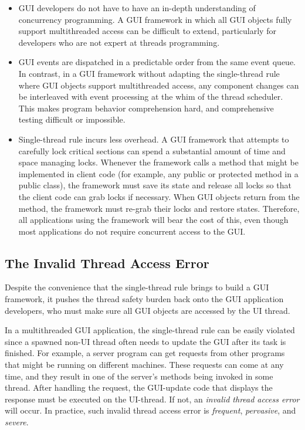 \begin{itemize}

\item GUI developers do not have to have an in-depth
understanding of concurrency programming. A GUI framework in which all GUI objects
fully support multithreaded access can be difficult to extend, particularly
for developers who are not expert at threads programming.

\item GUI events are dispatched in a predictable order from the same event queue.
In contrast, in a GUI framework without adapting the single-thread rule where GUI objects 
support multithreaded access, any component changes can be interleaved with event
processing at the whim of the thread scheduler. This makes program behavior comprehension hard,
 and comprehensive testing difficult or impossible. 

\item Single-thread rule incurs less overhead.
A GUI framework that attempts to carefully lock critical sections can spend a substantial
amount of time and space managing locks. Whenever the framework calls a method that might
be implemented in client code (for example, any public or protected method in a public class),
the framework must save its state and release all locks so that the client code can grab locks
if necessary. When GUI objects return from the method, the framework must re-grab their locks and
restore states. Therefore, all applications using the framework will bear the cost of this, even though most
applications do not require concurrent access to the GUI.

\end{itemize}


\subsection{The Invalid Thread Access Error}

Despite the convenience that the single-thread rule brings to build a
GUI framework, it pushes the thread safety burden back onto the GUI application developers,
who must make sure all GUI objects are accessed by the UI thread.

In a multithreaded GUI application, the single-thread rule can be
easily violated since a spawned non-UI thread often needs to update
the GUI  after its  task is finished.
For example, a server program can get requests from other programs
that might be running on different machines. These requests can come at any time,
and they result in one of the server's methods being invoked in some thread.
After handling the request, the GUI-update code that displays the response must be executed on the UI-thread.
If not, an \textit{invalid thread access error} will occur. In practice, such
invalid thread access error is \textit{frequent}, \textit{pervasive}, and \textit{severe}.

